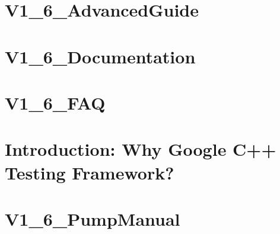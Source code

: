 \documentclass[twoside]{book}
\newcommand{\+}{\discretionary{\mbox{\scriptsize$\hookleftarrow$}}{}{}}
\begin{document}
\chapter{V1\+\_\+6\+\_\+\+Advanced\+Guide}
\label{md___users_fjp_git_bachelor_bachelor-master_updated_vfinal_googletest-1_88_80_googletest_docs__v1_6__advanced_guide}

\chapter{V1\+\_\+6\+\_\+\+Documentation}
\label{md___users_fjp_git_bachelor_bachelor-master_updated_vfinal_googletest-1_88_80_googletest_docs__v1_6__documentation}

\chapter{V1\+\_\+6\+\_\+\+F\+AQ}
\label{md___users_fjp_git_bachelor_bachelor-master_updated_vfinal_googletest-1_88_80_googletest_docs__v1_6__f_a_q}

\chapter{Introduction\+: Why Google C++ Testing Framework?}
\label{md___users_fjp_git_bachelor_bachelor-master_updated_vfinal_googletest-1_88_80_googletest_docs__v1_6__primer}

\chapter{V1\+\_\+6\+\_\+\+Pump\+Manual}
\label{md___users_fjp_git_bachelor_bachelor-master_updated_vfinal_googletest-1_88_80_googletest_docs__v1_6__pump_manual}

\end{document}
